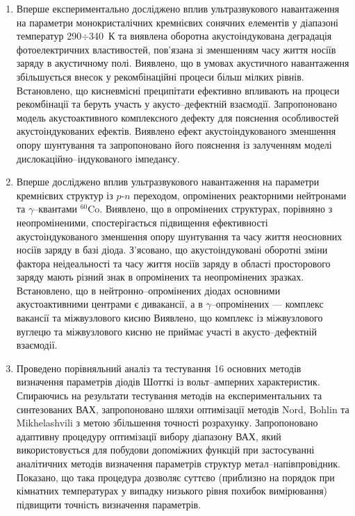 \begin{enumerate}[leftmargin=0cm,itemindent=3em]
  \item Вперше експериментально досліджено вплив ультразвукового навантаження на параметри монокристалічних кремнієвих сонячних елементів у діапазоні температур 290$\div$340~К
  та виявлена оборотна акустоіндукована деградація фотоелектричних властивостей, пов'язана зі зменшенням часу життя носіїв заряду в акустичному полі.
  Виявлено, що в умовах акустичного навантаження збільшується внесок у рекомбінаційні процеси більш мілких рівнів.
  Встановлено, що кисневмісні преципітати ефективно впливають на процеси рекомбінації та беруть участь у акусто--дефектній взаємодії.
  Запропоновано модель акустоактивного комплексного дефекту для пояснення особливостей акустоіндукованих ефектів.
 Виявлено ефект акустоіндукованого зменшення  опору шунтування та запропоновано його пояснення із залученням моделі дислокаційно--індукованого імпедансу.

\item Вперше досліджено вплив ультразвукового навантаження на параметри кремнієвих структур із $p$-$n$ переходом, опромінених реакторними нейтронами та $\gamma$--квантами $^{60}$Co.
      Виявлено, що в опромінених структурах, порівняно з неопроміненими, спостерігається підвищення ефективності акустоіндукованого зменшення  опору шунтування та часу життя неосновних носіїв заряду в базі діода.
      З'ясовано, що акустоіндуковані оборотні зміни фактора неідеальності та часу життя носіїв заряду в області просторового заряду   мають різний знак в опромінених та неопромінених зразках.
      Встановлено, що в нейтронно--опромінених діодах основними акустоактивними центрами є дивакансії,
      а в $\gamma$--опромінених --- комплекс вакансії та міжвузлового кисню
     Виявлено, що комплекс із міжвузлового вуглецю та міжвузлового кисню не приймає участі в акусто--дефектній взаємодії.

\item  Проведено порівняльний аналіз та тестування 16 основних методів визначення параметрів діодів Шотткі із вольт--амперних характеристик.
         Спираючись на результати тестування методів на експериментальних та синтезованих  ВАХ,
         запропоновано шляхи оптимізації методів Nord, Bohlin та Mikhelashvili з метою збільшення точності розрахунку.
      Запропоновано адаптивну процедуру оптимізації вибору діапазону ВАХ, який використовується для побудови допоміжних функцій при застосуванні аналітичних методів визначення параметрів структур метал--напівпровідник.
       Показано, що така процедура дозволяє суттєво (приблизно на порядок при кімнатних температурах у випадку низького рівня похибок вимірювання) підвищити точність визначення параметрів.


\end{enumerate}
